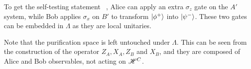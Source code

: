 To get the self-testing statement ~, Alice can apply an extra $\sigma_z$ gate on the $A'$ system, while Bob applies $\sigma_x$ on $B'$ to transform $\ket{\phi^+}$ into $\ket{\psi^-}$. These two gates can be embedded in $\Lambda$ as they are local unitaries.

Note that the purification space is left untouched under $\Lambda$. This can be seen from the construction of the operator $Z_A,X_A,Z_B$ and $X_B$, and they are composed of Alice and Bob observables, not acting on $\mathscr{H}^C$. 

